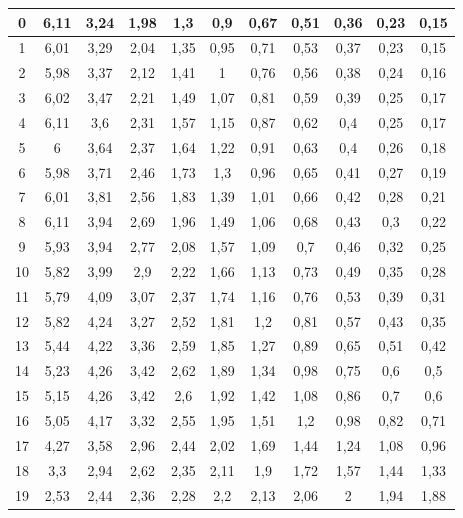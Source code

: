 \begin{longtable}[H]{|c|c|c|c|c|c|c|c|c|c|c|}
    \hline
    0 & 6,11 & 3,24 & 1,98 & 1,3 & 0,9 & 0,67 & 0,51 & 0,36 & 0,23 & 0,15  \\ \hline
    1 & 6,01 & 3,29 & 2,04 & 1,35 & 0,95 & 0,71 & 0,53 & 0,37 & 0,23 & 0,15  \\ \hline
    2 & 5,98 & 3,37 & 2,12 & 1,41 & 1 & 0,76 & 0,56 & 0,38 & 0,24 & 0,16  \\ \hline
    3 & 6,02 & 3,47 & 2,21 & 1,49 & 1,07 & 0,81 & 0,59 & 0,39 & 0,25 & 0,17  \\ \hline
    4 & 6,11 & 3,6 & 2,31 & 1,57 & 1,15 & 0,87 & 0,62 & 0,4 & 0,25 & 0,17  \\ \hline
    5 & 6 & 3,64 & 2,37 & 1,64 & 1,22 & 0,91 & 0,63 & 0,4 & 0,26 & 0,18  \\ \hline
    6 & 5,98 & 3,71 & 2,46 & 1,73 & 1,3 & 0,96 & 0,65 & 0,41 & 0,27 & 0,19  \\ \hline
    7 & 6,01 & 3,81 & 2,56 & 1,83 & 1,39 & 1,01 & 0,66 & 0,42 & 0,28 & 0,21  \\ \hline
    8 & 6,11 & 3,94 & 2,69 & 1,96 & 1,49 & 1,06 & 0,68 & 0,43 & 0,3 & 0,22  \\ \hline
    9 & 5,93 & 3,94 & 2,77 & 2,08 & 1,57 & 1,09 & 0,7 & 0,46 & 0,32 & 0,25  \\ \hline
    10 & 5,82 & 3,99 & 2,9 & 2,22 & 1,66 & 1,13 & 0,73 & 0,49 & 0,35 & 0,28  \\ \hline
    11 & 5,79 & 4,09 & 3,07 & 2,37 & 1,74 & 1,16 & 0,76 & 0,53 & 0,39 & 0,31  \\ \hline
    12 & 5,82 & 4,24 & 3,27 & 2,52 & 1,81 & 1,2 & 0,81 & 0,57 & 0,43 & 0,35  \\ \hline
    13 & 5,44 & 4,22 & 3,36 & 2,59 & 1,85 & 1,27 & 0,89 & 0,65 & 0,51 & 0,42  \\ \hline
    14 & 5,23 & 4,26 & 3,42 & 2,62 & 1,89 & 1,34 & 0,98 & 0,75 & 0,6 & 0,5  \\ \hline
    15 & 5,15 & 4,26 & 3,42 & 2,6 & 1,92 & 1,42 & 1,08 & 0,86 & 0,7 & 0,6  \\ \hline
    16 & 5,05 & 4,17 & 3,32 & 2,55 & 1,95 & 1,51 & 1,2 & 0,98 & 0,82 & 0,71  \\ \hline
    17 & 4,27 & 3,58 & 2,96 & 2,44 & 2,02 & 1,69 & 1,44 & 1,24 & 1,08 & 0,96  \\ \hline
    18 & 3,3 & 2,94 & 2,62 & 2,35 & 2,11 & 1,9 & 1,72 & 1,57 & 1,44 & 1,33  \\ \hline
    19  & 2,53 & 2,44 & 2,36 & 2,28 & 2,2 & 2,13 & 2,06 & 2 & 1,94 & 1,88 \\ \hline
    \end{longtable}

